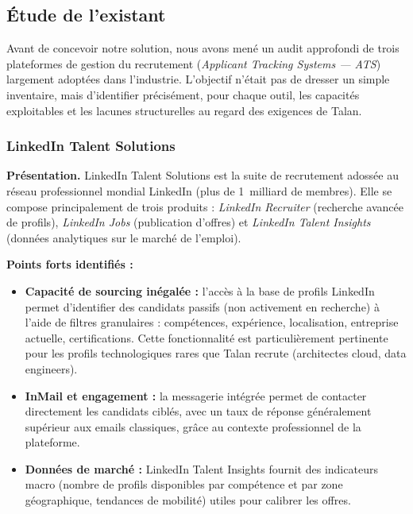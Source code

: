 \subsection{Étude de l'existant}

Avant de concevoir notre solution, nous avons mené un audit approfondi de trois plateformes de gestion du recrutement (\textit{Applicant Tracking Systems --- ATS}) largement adoptées dans l'industrie. L'objectif n'était pas de dresser un simple inventaire, mais d'identifier précisément, pour chaque outil, les capacités exploitables et les lacunes structurelles au regard des exigences de Talan.

\hypertarget{LinkedIn Talent}{}
\subsubsection{LinkedIn Talent Solutions}

\textbf{Présentation.} LinkedIn Talent Solutions est la suite de recrutement adossée au réseau professionnel mondial LinkedIn (plus de 1~milliard de membres). Elle se compose principalement de trois produits : \textit{LinkedIn Recruiter} (recherche avancée de profils), \textit{LinkedIn Jobs} (publication d'offres) et \textit{LinkedIn Talent Insights} (données analytiques sur le marché de l'emploi).

\medskip
\textbf{Points forts identifiés :}
\begin{itemize}
    \item \textbf{Capacité de sourcing inégalée :} l'accès à la base de profils LinkedIn permet d'identifier des candidats passifs (non activement en recherche) à l'aide de filtres granulaires : compétences, expérience, localisation, entreprise actuelle, certifications. Cette fonctionnalité est particulièrement pertinente pour les profils technologiques rares que Talan recrute (architectes cloud, data engineers).
    \item \textbf{InMail et engagement :} la messagerie intégrée permet de contacter directement les candidats ciblés, avec un taux de réponse généralement supérieur aux emails classiques, grâce au contexte professionnel de la plateforme.
    \item \textbf{Données de marché :} LinkedIn Talent Insights fournit des indicateurs macro (nombre de profils disponibles par compétence et par zone géographique, tendances de mobilité) utiles pour calibrer les offres.
\end{itemize}

